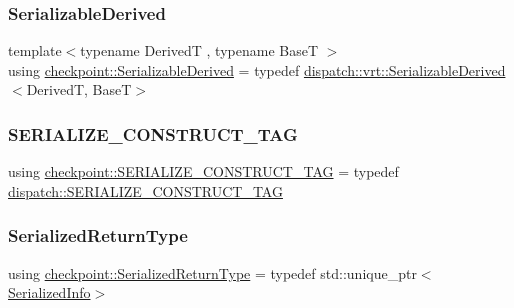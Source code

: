 \subsubsection{\texorpdfstring{Serializable\+Derived}{SerializableDerived}}
{\footnotesize\ttfamily template$<$typename DerivedT , typename BaseT $>$ \\
using \hyperlink{namespacecheckpoint_a9c4afb2c8d1bc1f58b9e158d64331d65}{checkpoint\+::\+Serializable\+Derived} = typedef \hyperlink{structcheckpoint_1_1dispatch_1_1vrt_1_1_serializable_derived}{dispatch\+::vrt\+::\+Serializable\+Derived}$<$DerivedT, BaseT$>$}

\mbox{\label{namespacecheckpoint_a7ff642cff4d72d01a16ab10e9bc363ef}} 
\subsubsection{\texorpdfstring{S\+E\+R\+I\+A\+L\+I\+Z\+E\+\_\+\+C\+O\+N\+S\+T\+R\+U\+C\+T\+\_\+\+T\+AG}{SERIALIZE\_CONSTRUCT\_TAG}}
{\footnotesize\ttfamily using \hyperlink{namespacecheckpoint_a7ff642cff4d72d01a16ab10e9bc363ef}{checkpoint\+::\+S\+E\+R\+I\+A\+L\+I\+Z\+E\+\_\+\+C\+O\+N\+S\+T\+R\+U\+C\+T\+\_\+\+T\+AG} = typedef \hyperlink{structcheckpoint_1_1dispatch_1_1_s_e_r_i_a_l_i_z_e___c_o_n_s_t_r_u_c_t___t_a_g}{dispatch\+::\+S\+E\+R\+I\+A\+L\+I\+Z\+E\+\_\+\+C\+O\+N\+S\+T\+R\+U\+C\+T\+\_\+\+T\+AG}}

\mbox{\label{namespacecheckpoint_aa61e2b491f405a63a394f9aad528c37a}} 
\subsubsection{\texorpdfstring{Serialized\+Return\+Type}{SerializedReturnType}}
{\footnotesize\ttfamily using \hyperlink{namespacecheckpoint_aa61e2b491f405a63a394f9aad528c37a}{checkpoint\+::\+Serialized\+Return\+Type} = typedef std\+::unique\+\_\+ptr$<$\hyperlink{structcheckpoint_1_1_serialized_info}{Serialized\+Info}$>$}



